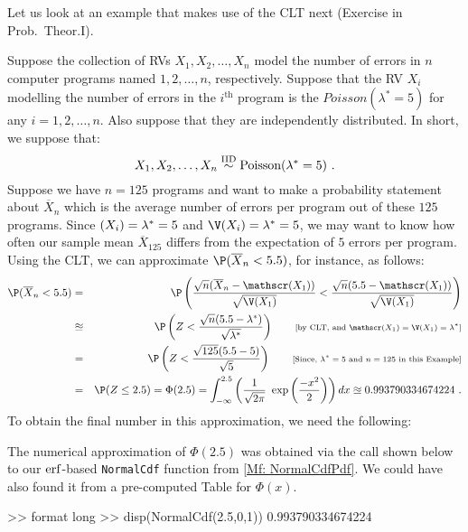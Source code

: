 Let us look at an example that makes use of the CLT next (Exercise in Prob.~Theor.I).
\begin{example}\label{EXCLTPoisson}
Suppose the collection of RVs $X_1,X_2, \ldots, X_n$ model the number of errors in $n$ computer programs named $1,2,\ldots,n$, respectively.  Suppose that the RV $X_i$ modelling the number of errors in the $i^{\text{th}}$ program is the $Poisson(\lambda^*=5)$ for any $i=1,2,\ldots,n$.  Also suppose that they are independently distributed.  In short, we suppose that:
\[
X_1,X_2,\ldots,X_n \overset{{\rm IID}}{\sim} \mbox{{\rm Poisson}}(\lambda^*=5) \ . 
\]
Suppose we have $n=125$ programs and want to make a probability statement about $\overline{X}_n$ which is the average number of errors per program out of these $125$ programs.  Since $\mathscr{(}X_i) = \lambda^*=5$ and $\V(X_i)=\lambda^*=5$, we may want to know how often our sample mean $\overline{X}_{125}$ differs from the expectation of $5$ errors per program.  Using the CLT, we can approximate $\P(\overline{X}_n < 5.5)$, for instance, as follows:
\begin{eqnarray}
\P(\overline{X}_n < 5.5) 
&=& \P \left( \frac{\sqrt{n}(\overline{X}_n - \E(X_1))}{\sqrt{\V(X_1)}} < \frac{\sqrt{n}(5.5-\E(X_1))}{\sqrt{\V(X_1)}} \right) \notag \\
&\approxeq& \P \left( Z < \frac{\sqrt{n}(5.5-\lambda^*)}{\sqrt{\lambda^*}} \right) \qquad \text{{\scriptsize [by CLT, and $\E(X_1)=\V(X_1)=\lambda^*$]}} \notag \\
&=& \P \left( Z < \frac{\sqrt{125}(5.5-5)}{\sqrt{5}} \right) \qquad \text{{\scriptsize [Since, $\lambda^*=5$ and $n=125$ in this Example]}} \notag \\
&=& \P(Z \leq 2.5) = \Phi(2.5) =  \int_{- \infty}^{2.5} \left( \frac{1}{\sqrt{2 \pi}} \ \exp \left( \frac{-x^2}{2} \right) \right) dx \approxeq 0.993790334674224 \ . \notag
\end{eqnarray}
To obtain the final number in this approximation, we need the following:
\begin{labwork}
The numerical approximation of $\Phi(2.5)$ was obtained via the call shown below to our $\operatorname{erf}$-based {\tt NormalCdf} function from \ref*{Mf: NormalCdfPdf}.  We could have also found it from a pre-computed Table for $\Phi(x)$.
\begin{VrbM}
>> format long
>> disp(NormalCdf(2.5,0,1))
   0.993790334674224
\end{VrbM}
\end{labwork}
\end{example}

